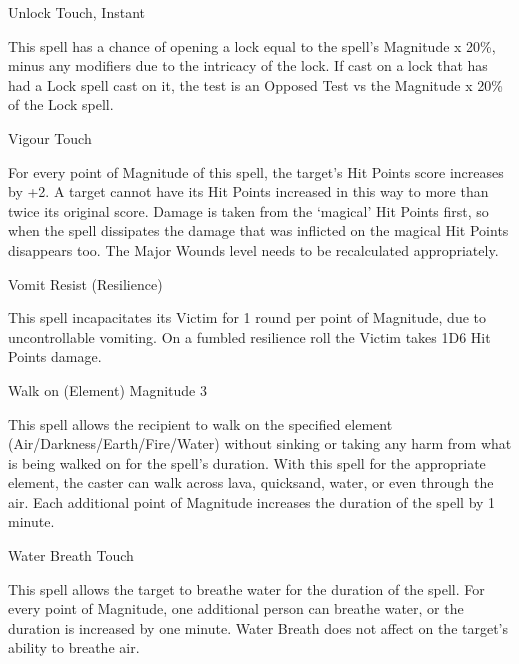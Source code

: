 \begin{rpg-spell}
{Unlock}
{Touch, Instant}

This spell has a chance of opening a lock equal to the spell’s Magnitude x 20\%, minus any modifiers due to the intricacy of the lock. If cast on a lock that has had a Lock spell cast on it, the test is an Opposed Test vs the Magnitude x 20\% of the Lock spell.
\end{rpg-spell}


\begin{rpg-spell}
{Vigour}
{Touch}

For every point of Magnitude of this spell, the target’s Hit Points score increases by +2. A target cannot have its Hit Points increased in this way to more than twice its original score. Damage is taken from the ‘magical’ Hit Points first, so when the spell dissipates the damage that was inflicted on the magical Hit Points disappears too. The Major Wounds level needs to be recalculated appropriately.
\end{rpg-spell}


\begin{rpg-spell}
{Vomit}
{Resist (Resilience)}

This spell incapacitates its Victim for 1 round per point of Magnitude, due to uncontrollable vomiting. On a fumbled resilience roll the Victim takes 1D6 Hit Points damage.
\end{rpg-spell}


\begin{rpg-spell}
{Walk on (Element)}
{Magnitude 3}

This spell allows the recipient to walk on the specified element (Air/Darkness/Earth/Fire/Water) without sinking or taking any harm from what is being walked on for the spell’s duration. With this spell for the appropriate element, the caster can walk across lava, quicksand, water, or even through the air. Each additional point of Magnitude increases the duration of the spell by 1 minute.
\end{rpg-spell}


\begin{rpg-spell}
{Water Breath}
{Touch}

This spell allows the target to breathe water for the duration of the spell. For every point of Magnitude, one additional person can breathe water, or the duration is increased by one minute. Water Breath does not affect on the target’s ability to breathe air.
\end{rpg-spell}


